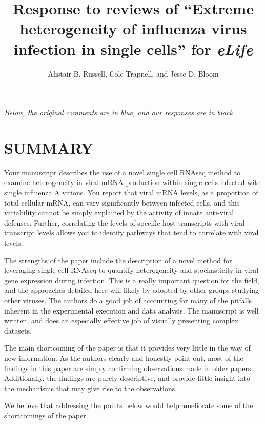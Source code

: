 \documentclass[11pt, oneside]{article}   	%
\title{Response to reviews of ``Extreme heterogeneity of influenza virus infection in single cells'' for \textit{eLife}}
\author{Alistair B. Russell, Cole Trapnell, and Jesse D. Bloom}
\begin{document}
\maketitle

\emph{Below, the original comments {\color{blue} are in blue}, and our responses are in black.}

\color{blue}

\section*{SUMMARY} 

Your manuscript describes the use of a novel single cell RNAseq method to examine heterogeneity in viral mRNA production within single cells infected with single influenza A virions. You report that viral mRNA levels, as a proportion of total cellular mRNA, can vary significantly between infected cells, and this variability cannot be simply explained by the activity of innate anti-viral defenses. Further, correlating the levels of specific host transcripts with viral transcript levels allows you to identify pathways that tend to correlate with viral levels. 

The strengths of the paper include the description of a novel method for leveraging single-cell RNAseq to quantify heterogeneity and stochasticity in viral gene expression during infection. This is a really important question for the field, and the approaches detailed here will likely by adopted by other groups studying other viruses. The authors do a good job of accounting for many of the pitfalls inherent in the experimental execution and data analysis. The manuscript is well written, and does an especially effective job of visually presenting complex datasets. 

The main shortcoming of the paper is that it provides very little in the way of new information. As the authors clearly and honestly point out, most of the findings in this paper are simply confirming observations made in older papers. Additionally, the findings are purely descriptive, and provide little insight into the mechanisms that may give rise to the observations. 

We believe that addressing the points below would help ameliorate some of the shortcomings of the paper. 
\end{document}
